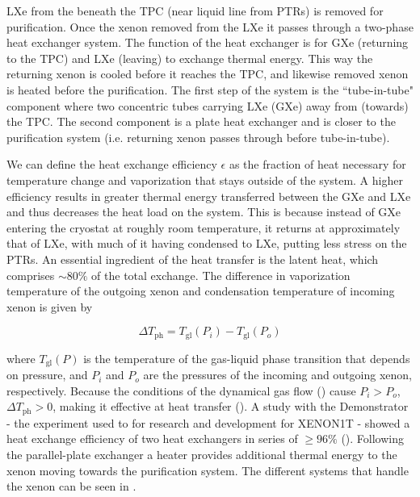 LXe from the beneath the TPC (near liquid line from PTRs) is removed for purification.  Once the xenon removed from the LXe it passes
through a two-phase heat exchanger system.  The function of the heat exchanger is for GXe (returning to the TPC) and LXe (leaving) to
exchange thermal energy.  This way the returning xenon is cooled before it reaches the TPC, and likewise removed xenon is heated before
the purification.  The first step of the system is the ``tube-in-tube" component where two concentric tubes carrying LXe (GXe) away from
(towards)
the TPC.  The second component is a plate heat exchanger and is closer to the purification system (i.e. returning xenon passes through
before tube-in-tube).

We can define the heat exchange
efficiency $\epsilon$ as the fraction of heat necessary for temperature change and vaporization that stays outside of the system.  A higher
efficiency results in greater thermal energy transferred between the GXe and LXe and thus decreases the heat load on the system.  This is
because instead of GXe entering the cryostat at roughly
room temperature, it returns at approximately that of LXe, with much of it having condensed to LXe, putting less stress on the
PTRs.  An essential ingredient of the heat transfer is the latent heat, which comprises ${\sim} 80\%$ of the total exchange.  The difference
in vaporization temperature of the outgoing xenon and condensation temperature of incoming xenon is given by

\begin{equation}
\Delta T_{\mathrm{ph}} = T_{\mathrm{gl}} (P_i) - T_{\mathrm{gl}} (P_o)
\label{eq:xenon1t_cryo_latent}
\end{equation}

where $T_{\mathrm{gl}} (P)$ is the temperature of the gas-liquid phase transition that depends on pressure, and $P_i$ and $P_o$ are the
pressures of the incoming and outgoing xenon, respectively.  Because the conditions of the dynamical gas flow
() cause $P_i > P_o$, $\Delta T_{\mathrm{ph}} > 0$, making it effective at heat transfer
().  A study with the Demonstrator - the
experiment used to for research and development for XENON1T - showed a heat exchange efficiency of
two heat exchangers in series of $\geq 96\%$ ().  Following the parallel-plate exchanger a heater provides additional
thermal energy to the xenon moving towards the purification system.  The different systems that handle the xenon can be seen in
.

